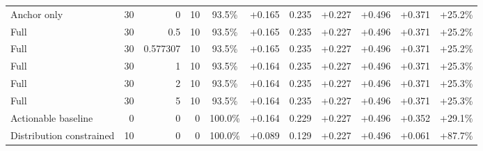 \begin{table}[htbp]
\begin{tabular}{lrrrccccccc}
Anchor only & 30 & 0 & 10 & 93.5\% & +0.165 & 0.235 & +0.227 & +0.496 & +0.371 & +25.2\% \\
Full & 30 & 0.5 & 10 & 93.5\% & +0.165 & 0.235 & +0.227 & +0.496 & +0.371 & +25.2\% \\
Full & 30 & 0.577307 & 10 & 93.5\% & +0.165 & 0.235 & +0.227 & +0.496 & +0.371 & +25.2\% \\
Full & 30 & 1 & 10 & 93.5\% & +0.164 & 0.235 & +0.227 & +0.496 & +0.371 & +25.3\% \\
Full & 30 & 2 & 10 & 93.5\% & +0.164 & 0.235 & +0.227 & +0.496 & +0.371 & +25.3\% \\
Full & 30 & 5 & 10 & 93.5\% & +0.164 & 0.235 & +0.227 & +0.496 & +0.371 & +25.3\% \\
Actionable baseline & 0 & 0 & 0 & 100.0\% & +0.164 & 0.229 & +0.227 & +0.496 & +0.352 & +29.1\% \\
Distribution constrained & 10 & 0 & 0 & 100.0\% & +0.089 & 0.129 & +0.227 & +0.496 & +0.061 & +87.7\% \\
\bottomrule
\end{tabular}
\end{table}